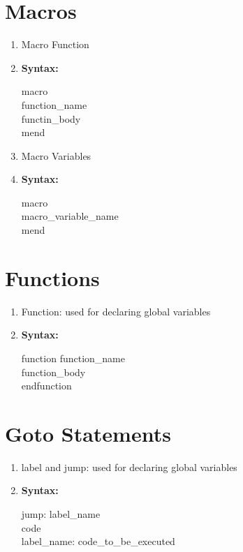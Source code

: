 \documentclass{scrreprt}
\begin{document}
\section{Macros}
\begin{enumerate}
\item Macro Function
\item[] \textbf{Syntax:}\\
\begin{center}
macro\\
function_name\\
functin_body\\
mend\\
\end{center}

\item Macro Variables
\item[] \textbf{Syntax:}\\
\begin{center}
macro\\
macro_variable_name\\
mend\\
\end{center}
\end{enumerate}

\section{Functions}
\begin{enumerate}
\item  Function: used for declaring global variables
\item[] \textbf{Syntax:}\\
\begin{center}
function function_name\\
function_body\\
endfunction\\
\end{center}
\end{enumerate}

\section{Goto Statements}
\begin{enumerate}
\item  label and jump: used for declaring global variables
\item[] \textbf{Syntax:}\\
\begin{center}
jump: label_name\\
code\\
label_name: code_to_be_executed
\end{center}
\end{enumerate}
\end{document}
